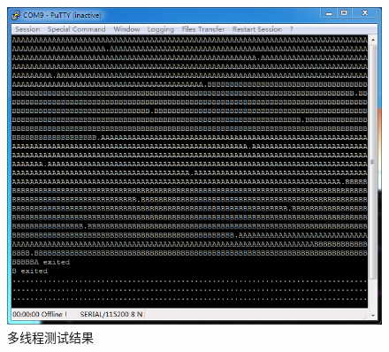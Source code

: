 \documentclass[main.tex]{subfiles}
\begin{document}
\begin{CJK*}{UTF8}{song}
\begin{figure}[htp]
\centering
\includegraphics[scale=0.4]{figures/5-2}
\caption{多线程测试结果}
\label{figure:5-2}
\end{figure}


\clearpage
\ifxetex\else\end{CJK*}\fi
\end{document}
